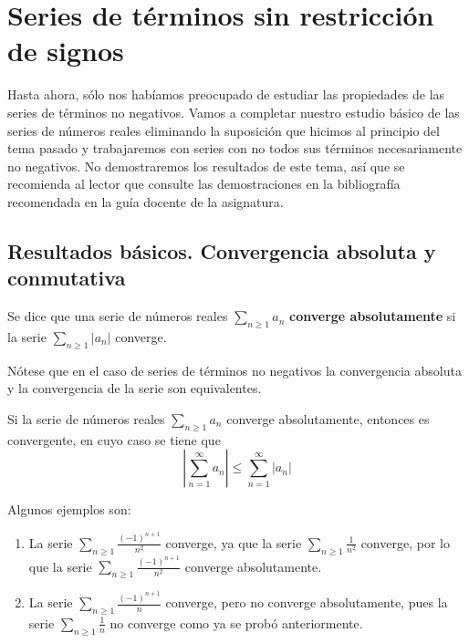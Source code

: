 \chapter{Series de términos sin restricción de signos}\label{chp:Tema11}

Hasta ahora, sólo nos habíamos preocupado de estudiar las propiedades de las series de términos no negativos. Vamos a completar nuestro estudio básico de las series de números reales eliminando la suposición que hicimos al principio del tema pasado y trabajaremos con series con no todos sus términos necesariamente no negativos. No demostraremos los resultados de este tema, así que se recomienda al lector que consulte las demostraciones en la bibliografía recomendada en la guía docente de la asignatura.


\section{Resultados básicos. Convergencia absoluta y conmutativa}
\begin{definicion}
    Se dice que una serie de números reales $\displaystyle\sum_{n \geq 1} a_n$ \textbf{converge absolutamente} si la serie $\displaystyle\sum_{n \geq 1} |a_n|$ converge.
\end{definicion}

Nótese que en el caso de series de términos no negativos la convergencia absoluta y la convergencia de la serie son equivalentes.

\begin{teo}
    Si la serie de números reales $\displaystyle\sum_{n \geq 1} a_n$ converge absolutamente, entonces es convergente, en cuyo caso se tiene que
    \begin{equation*}
        \left| \displaystyle\sum_{n = 1}^{\infty} a_n \right| \leq \displaystyle\sum_{n = 1}^{\infty} |a_n|
    \end{equation*}
\end{teo}

\begin{ejemplo}
    Algunos ejemplos son:
    \begin{enumerate}
        \item La serie $\displaystyle\sum_{n \geq 1} \frac{(-1)^{n+1}}{n^2}$ converge, ya que la serie $\displaystyle\sum_{n \geq 1} \frac{1}{n^2}$ converge, por lo que la serie $\displaystyle\sum_{n \geq 1} \frac{(-1)^{n+1}}{n^2}$ converge absolutamente.

        \item La serie $\displaystyle\sum_{n \geq 1} \frac{(-1)^{n+1}}{n}$ converge, pero no converge absolutamente, pues  la serie $\displaystyle\sum_{n \geq 1} \frac{1}{n}$ no converge como ya se probó anteriormente.
    \end{enumerate}
\end{ejemplo}

